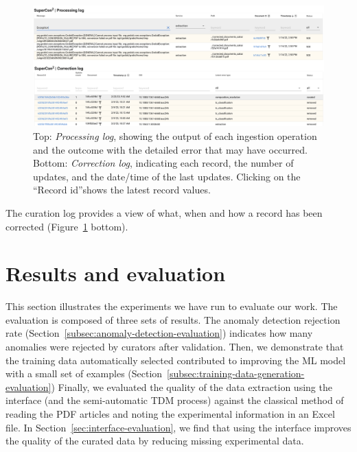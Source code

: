 \begin{figure}[htbp]
  \centering
  \includegraphics[width=1\textwidth]{figures/curation/processing-curation-log.png} 
  \caption{Top: \textit{Processing log}, showing the output of each ingestion operation and the outcome with the detailed error that may have occurred. Bottom: \textit{Correction log}, indicating each record, the number of updates, and the date/time of the last updates. Clicking on the ``Record id''shows the latest record values.}
  \label{fig:processing-curation-log}
\end{figure}

The curation log provides a view of what, when and how a record has been corrected (Figure~\ref{fig:processing-curation-log} bottom).


\section{Results and evaluation}
\label{sec:results-and-evaluation}

This section illustrates the experiments we have run to evaluate our work. 
The evaluation is composed of three sets of results. 
The anomaly detection rejection rate (Section~\ref{subsec:anomaly-detection-evaluation}) indicates how many anomalies were rejected by curators after validation. 
Then, we demonstrate that the training data automatically selected contributed to improving the ML model with a small set of examples (Section~\ref{subsec:training-data-generation-evaluation}) 
Finally, we evaluated the quality of the data extraction using the interface (and the semi-automatic TDM process) against the classical method of reading the PDF articles and noting the experimental information in an Excel file. In Section~\ref{sec:interface-evaluation}, we find that using the interface improves the quality of the curated data by reducing missing experimental data. 


